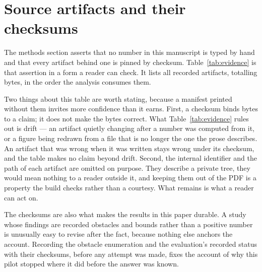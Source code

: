 \appendix

\section{Source artifacts and their checksums}
\label{app:evidence}

The methods section asserts that no number in this manuscript is typed by hand
and that every artifact behind one is pinned by checksum.
Table~\ref{tab:evidence} is that assertion in a form a reader can check. It
lists all \NEvidence{} recorded artifacts, totalling \EvidenceBytes{} bytes, in
the order the analysis consumes them.

Two things about this table are worth stating, because a manifest printed
without them invites more confidence than it earns. First, a checksum binds
bytes to a claim; it does not make the bytes correct. What
Table~\ref{tab:evidence} rules out is drift --- an artifact quietly changing
after a number was computed from it, or a figure being redrawn from a file
that is no longer the one the prose describes. An artifact that was wrong when
it was written stays wrong under its checksum, and the table makes no claim
beyond drift. Second, the internal identifier and the path of each artifact
are omitted on purpose. They describe a private tree, they would mean nothing
to a reader outside it, and keeping them out of the PDF is a property the
build checks rather than a courtesy. What remains is what a reader can act on.

The checksums are also what makes the results in this paper durable. A study
whose findings are recorded obstacles and bounds rather than a positive number
is unusually easy to revise after the fact, because nothing else anchors the
account. Recording the obstacle enumeration and the evaluation's recorded
status with their checksums, before any attempt was made, fixes the account of
why this pilot stopped where it did before the answer was known.

\begin{table}[htbp]
\centering
\caption{Every artifact this manuscript rests on, with its size and the first
16 hexadecimal characters of its SHA-256 checksum. Full checksums, and the
paths the checksums apply to, are in the manifest that accompanies the
manuscript source; the prefix is shown here only because a 64-character
checksum does not set in a table column. The figure and table code recomputes
each checksum from the bytes on disk before reading them and stops the build
on any mismatch, so no stale artifact reaches the page.}
\label{tab:evidence}
\footnotesize

\end{table}

